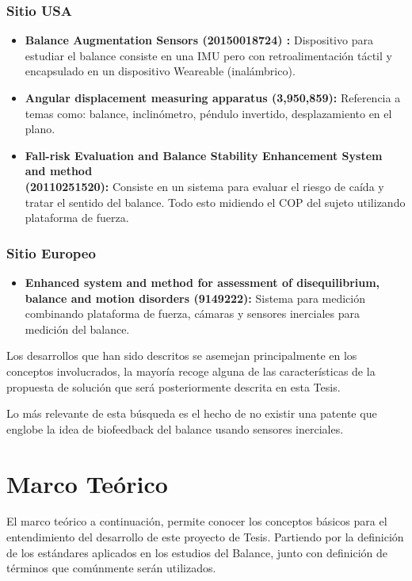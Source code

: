 \documentclass[12pt,a4paper]{article}
\begin{document}
\subsubsection{Sitio USA}
\begin{itemize}
	\item \textbf{Balance Augmentation Sensors (20150018724) :} Dispositivo para estudiar el balance consiste en una IMU pero con retroalimentación táctil y encapsulado en un dispositivo Weareable (inalámbrico).
	\item \textbf{Angular displacement measuring apparatus (3,950,859): } Referencia a temas como: balance, inclinómetro, péndulo invertido, desplazamiento en el plano.
	\item \textbf{Fall-risk Evaluation and Balance Stability Enhancement System and method \\(20110251520):} 
	Consiste en un sistema para evaluar el riesgo de caída y tratar el sentido del balance. Todo esto midiendo el COP del sujeto utilizando plataforma de fuerza.
\end{itemize}

\subsubsection{Sitio Europeo}
\begin{itemize}
	\item \textbf{Enhanced system and method for assessment of disequilibrium, balance and motion disorders (9149222):} Sistema para medición combinando plataforma de fuerza, cámaras y sensores inerciales para medición del balance.
\end{itemize}

Los desarrollos que han sido descritos se asemejan principalmente en los conceptos involucrados, la mayoría recoge alguna de las características de la propuesta de solución que será posteriormente descrita en esta Tesis.

Lo más relevante de esta búsqueda es el hecho de no existir una patente que englobe la idea de biofeedback del balance usando sensores inerciales. 

\section{Marco Teórico}

El marco teórico a continuación, permite conocer los conceptos básicos para el entendimiento del desarrollo de este proyecto de Tesis.
Partiendo por la definición de los estándares aplicados en los estudios del Balance, junto con definición de términos que comúnmente serán utilizados.
\end{document}
